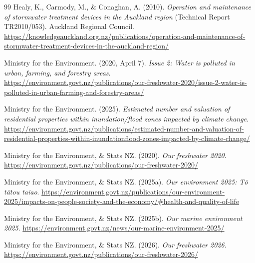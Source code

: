 \documentclass[11pt,a4paper]{article}
\newcommand{\todoref}[1]{\textcolor{red}{\textbf{[#1]}}}
\begin{document}
\begin{thebibliography}{99}
Healy, K., Carmody, M., \& Conaghan, A. (2010). \textit{Operation and maintenance of stormwater treatment devices in the Auckland region} (Technical Report TR2010/053). Auckland Regional Council. \url{https://knowledgeauckland.org.nz/publications/operation-and-maintenance-of-stormwater-treatment-devices-in-the-auckland-region/}


Ministry for the Environment. (2020, April 7). \textit{Issue 2: Water is polluted in urban, farming, and forestry areas}. \url{https://environment.govt.nz/publications/our-freshwater-2020/issue-2-water-is-polluted-in-urban-farming-and-forestry-areas/}

Ministry for the Environment. (2025). \textit{Estimated number and valuation of residential properties within inundation/flood zones impacted by climate change}. \url{https://environment.govt.nz/publications/estimated-number-and-valuation-of-residential-properties-within-inundationflood-zones-impacted-by-climate-change/}

Ministry for the Environment, \& Stats NZ. (2020). \textit{Our freshwater 2020}. \url{https://environment.govt.nz/publications/our-freshwater-2020/}

Ministry for the Environment, \& Stats NZ. (2025a). \textit{Our environment 2025: T\=o t\=atou taiao}. \url{https://environment.govt.nz/publications/our-environment-2025/impacts-on-people-society-and-the-economy/#health-and-quality-of-life}

Ministry for the Environment, \& Stats NZ. (2025b). \textit{Our marine environment 2025}. \url{https://environment.govt.nz/news/our-marine-environment-2025/}

Ministry for the Environment, \& Stats NZ. (2026). \textit{Our freshwater 2026}. \url{https://environment.govt.nz/publications/our-freshwater-2026/}


\end{thebibliography}
\end{document}
